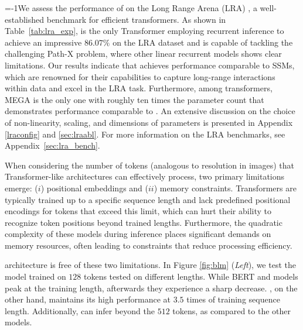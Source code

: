 \looseness=-1We assess the performance of \lions on the Long Range Arena (LRA) \citep{lra}, a well-established benchmark for efficient transformers. 
As shown in Table~\ref{tab:lra_exp}, \lions is the only Transformer employing recurrent inference to achieve an impressive \(86.07\%\) on the LRA dataset and is capable of tackling the challenging Path-X problem, where other linear recurrent models shows clear limitations. 
Our results indicate that \lions achieves performance comparable to SSMs, which are renowned for their capabilities to capture long-range interactions within data and excel in the LRA task. 
Furthermore, among transformers, MEGA \citep{ma2022mega} is the only one with roughly ten times the parameter count that demonstrates performance comparable to \lions. 
An extensive discussion on the choice of non-linearity, scaling, and dimensions of parameters is presented in Appendix \ref{lraconfig} and \ref{sec:lraabl}. For more information on the LRA benchmarks, see Appendix~\ref{sec:lra_bench}.





When considering the number of tokens (analogous to resolution in images) that Transformer-like architectures can effectively process, two primary limitations emerge: ($i$) positional embeddings and ($ii$) memory constraints. Transformers are typically trained up to a specific sequence length and lack predefined positional encodings for tokens that exceed this limit, which can hurt their ability to recognize token positions beyond trained lengths. Furthermore, the quadratic complexity of these models during inference places significant demands on memory resources, often leading to constraints that reduce processing efficiency.



\lions architecture is free of these two limitations. In Figure \ref{fig:blm} (\textit{Left}), we test the \lions model trained on $128$ tokens tested on different lengths. While BERT and \lionlit models peak at the training length, afterwards they experience a sharp decrease. \lions, on the other hand, maintains its high performance at $3.5$ times of training sequence length. Additionally, \lions can infer beyond the $512$ tokens, as compared to the other models.

